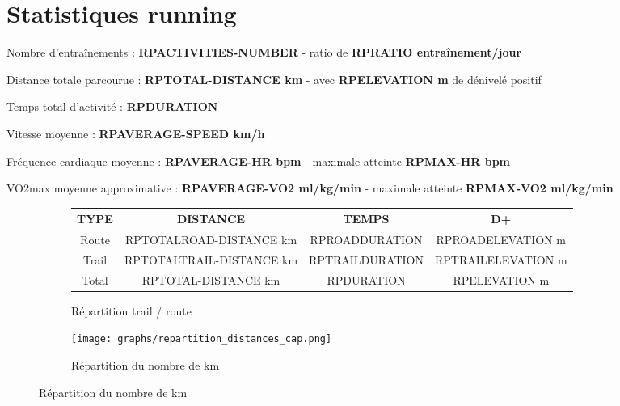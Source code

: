 \documentclass[a4paper,french,11pt]{report}
\begin{document}

\section*{Statistiques running}
\thispagestyle{empty}


\textbullet Nombre d'entraînements : \textbf{RPACTIVITIES-NUMBER} -
ratio de \textbf{RPRATIO entraînement/jour}

\textbullet Distance totale parcourue : \textbf{RPTOTAL-DISTANCE km} -
avec \textbf{RPELEVATION m} de dénivelé positif

\textbullet Temps total d'activité : \textbf{RPDURATION}

\textbullet Vitesse moyenne : \textbf{RPAVERAGE-SPEED km/h}

\textbullet Fréquence cardiaque moyenne : \textbf{RPAVERAGE-HR bpm} -
maximale atteinte \textbf{RPMAX-HR bpm}

\textbullet VO2max moyenne approximative : \textbf{RPAVERAGE-VO2 ml/kg/min} -
maximale atteinte \textbf{RPMAX-VO2 ml/kg/min}

\begin{figure}[!ht]
\begin{subfigure}{.49\linewidth}

\centering

\begin{tabular}{|c|c|c|c|}
\hline
\textbf{TYPE}  & \textbf{DISTANCE}        & \textbf{TEMPS}  & \textbf{D+}       \\ \hline
Route          & RPTOTALROAD-DISTANCE km  & RPROADDURATION  & RPROADELEVATION m  \\ \hline
Trail          & RPTOTALTRAIL-DISTANCE km & RPTRAILDURATION & RPTRAILELEVATION m \\ \hline
Total          & RPTOTAL-DISTANCE km      & RPDURATION      & RPELEVATION m      \\ \hline
\end{tabular}
\caption*{Répartition trail / route}

\end{subfigure}\hfill
\begin{subfigure}{.49\linewidth}

\centering

\texttt{[image: graphs/repartition\_distances\_cap.png]}
\caption*{Répartition du nombre de km}

\end{subfigure}
\end{figure}
\end{document}

